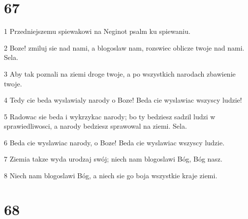 \chapter{67}

\par 1 Przedniejszemu spiewakowi na Neginot psalm ku spiewaniu.
\par 2 Boze! zmiluj sie nad nami, a blogoslaw nam, rozswiec oblicze twoje nad nami. Sela.
\par 3 Aby tak poznali na ziemi droge twoje, a po wszystkich narodach zbawienie twoje.
\par 4 Tedy cie beda wyslawialy narody o Boze! Beda cie wyslawiac wszyscy ludzie!
\par 5 Radowac sie beda i wykrzykac narody; bo ty bedziesz sadzil ludzi w sprawiedliwosci, a narody bedziesz sprawowal na ziemi. Sela.
\par 6 Beda cie wyslawiac narody, o Boze! Beda cie wyslawiac wszyscy ludzie.
\par 7 Ziemia takze wyda urodzaj swój; niech nam blogoslawi Bóg, Bóg nasz.
\par 8 Niech nam blogoslawi Bóg, a niech sie go boja wszystkie kraje ziemi.

\chapter{68}

